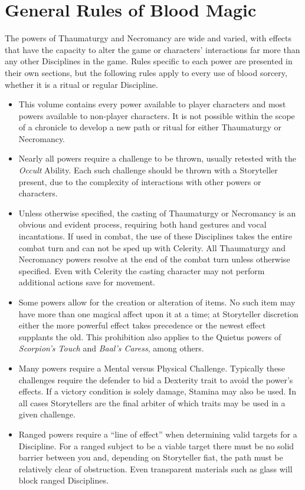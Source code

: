 \section{General Rules of Blood Magic}
\label{sec:rules}
The powers of Thaumaturgy and Necromancy are wide and varied, with effects that have the capacity 
to alter the game or characters' interactions far more than any other Disciplines in the game.  
Rules specific to each power are presented in their own sections, but the following rules apply to 
every use of blood sorcery, whether it is a ritual or regular Discipline.

\begin{itemize}
	\item This volume contains every power available to player characters and most powers available to 
	non-player characters.  It is not possible within the scope of a chronicle to develop a new path 
	or ritual for either Thaumaturgy or Necromancy.
	\item Nearly all powers require a challenge to be thrown, usually retested with the \emph{Occult} 
	Ability.  Each such challenge should be thrown with a Storyteller present, due to the complexity 
	of interactions with other powers or characters.
	\item Unless otherwise specified, the casting of Thaumaturgy or Necromancy is an obvious and evident 
	process, requiring both hand gestures and vocal incantations.  If used in combat, the use of these 
	Disciplines takes the entire combat turn and can not be sped up with Celerity.  All Thaumaturgy and 
	Necromancy powers resolve at the end of the combat turn unless otherwise specified.  Even with 
	Celerity the casting character may not perform additional actions save for movement.
	\item Some powers allow for the creation or alteration of items.  No such item may have more than 
	one magical affect upon it at a time; at Storyteller discretion either the more powerful effect 
	takes precedence or the newest effect supplants the old.  This prohibition also applies to the 
	Quietus powers of \emph{Scorpion's Touch} and \emph{Baal's Caress}, among others.
	\item Many powers require a Mental versus Physical Challenge.  Typically these challenges require 
	the defender to bid a Dexterity trait to avoid the power's effects.  If a victory condition is solely 
	damage, Stamina may also be used.  In all cases Storytellers are the final arbiter of which traits may 
	be used in a given challenge.
	\item Ranged powers require a ``line of effect'' when determining valid targets for a Discipline.  
	For a ranged subject to be a viable target there must be no solid barrier between you and, depending on 
	Storyteller fiat, the path must be relatively clear of obstruction.  Even transparent materials such as 
	glass will block ranged Disciplines.
\end{itemize}